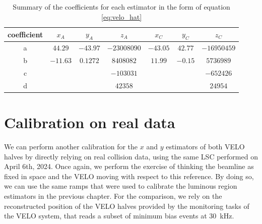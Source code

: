 \begin{table}
\centering
\begin{tabular}{c|c|c|c|c|c|c}
coefficient  & $x_A$   & $y_A$   & $z_A$      & $x_C$   & $y_C$  & $z_C$      \\\hline
a & $44.29$  & $-43.97$ &  $-23008090$    & $-43.05$ & $42.77$ &   $-16950459$   \\
b & $-11.63$ & $0.1272$ & $8408082$   & $11.99$  & $-0.15$ &  $5736989$ \\
c &        &        & $-103031$   &        &       &  $-652426 $  \\
d &        &        &  $42358$ &        &       & $24954$
\end{tabular}
\caption{Summary of the coefficients for each estimator in the form of equation \eqref{eq:velo_hat}}\label{tab:coefficients}
\end{table}

\section{Calibration on real data}
We can perform another calibration for the $x$ and $y$ estimators of both VELO halves by directly relying on real collision data, using the same LSC performed on April 6th, 2024. 
Once again, we perform the exercise of thinking the beamline as fixed in space and the VELO moving with respect to this reference. By doing so, we can use the same ramps that were used to calibrate the luminous region estimators in the previous chapter. For the comparison, we rely on the reconstructed position of the VELO halves provided by the monitoring tasks of the VELO system, that reads a subset of minimum bias events at \SI{30}{\kilo\hertz}. 

